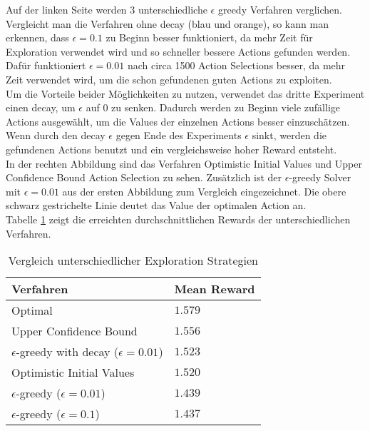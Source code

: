 \documentclass[11pt]{scrartcl}
\begin{document}
\noindent
Auf der linken Seite werden 3 unterschiedliche $\epsilon$ greedy Verfahren verglichen.
Vergleicht man die Verfahren ohne decay (blau und orange), so kann man erkennen, dass
$\epsilon = 0.1$ zu Beginn besser funktioniert, da mehr Zeit für Exploration verwendet
wird und so schneller bessere Actions gefunden werden. Dafür funktioniert $\epsilon =
0.01$ nach circa 1500 Action Selections besser, da mehr Zeit verwendet wird, um die schon
gefundenen guten Actions zu exploiten.\\
Um die Vorteile beider Möglichkeiten zu nutzen, verwendet das dritte Experiment einen
decay, um $\epsilon$ auf $0$ zu senken. Dadurch werden zu Beginn viele zufällige Actions
ausgewählt, um die Values der einzelnen Actions besser einzuschätzen. Wenn durch den decay
$\epsilon$ gegen Ende des Experiments $\epsilon$ sinkt, werden die gefundenen Actions
benutzt und ein vergleichsweise hoher Reward entsteht.\\
In der rechten Abbildung sind das Verfahren Optimistic Initial Values und Upper Confidence
Bound Action Selection zu sehen. Zusätzlich ist der $\epsilon$-greedy Solver mit
$\epsilon=0.01$ aus der ersten Abbildung zum Vergleich eingezeichnet. Die obere schwarz
gestrichelte Linie deutet das Value der optimalen Action an.\\
Tabelle \ref{tab:explorationstrategies} zeigt die erreichten durchschnittlichen Rewards
der unterschiedlichen Verfahren.

\begin{table}[h]
  \begin{center}
    \begin{tabular}{l | l}
      \textbf{Verfahren} & \textbf{Mean Reward} \\
      \hline
      Optimal & $1.579$\\
      Upper Confidence Bound & $1.556$ \\
      $\epsilon$-greedy with decay ($\epsilon=0.01$) & $1.523$ \\
      Optimistic Initial Values & $1.520$ \\
      $\epsilon$-greedy ($\epsilon=0.01$) & $1.439$ \\
      $\epsilon$-greedy ($\epsilon=0.1$) & $1.437$ \\
    \end{tabular}

    \caption[ExplorationStrategies]{Vergleich unterschiedlicher Exploration Strategien}
    \label{tab:explorationstrategies}
  \end{center}
\end{table}
\end{document}
